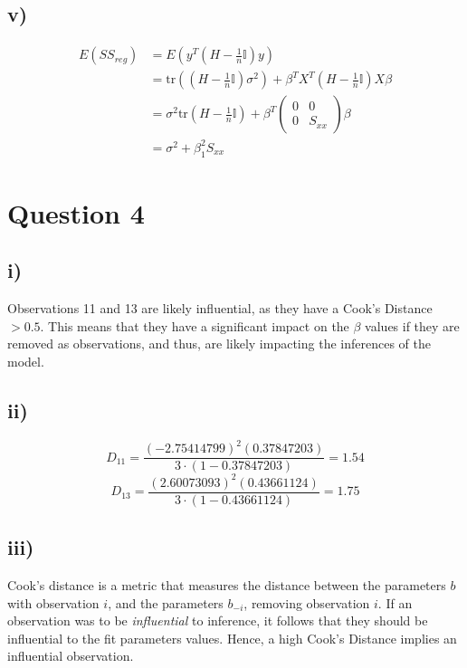 \documentclass{article}
\begin{document}
\subsection*{v)}
\begin{align*}
    E(SS_{reg}) &= E\left( y^T(H - \frac{1}{n}\mathbb{I})y\right) \\ 
    &= \text{tr}((H - \frac{1}{n}\mathbb{I})\sigma^2) + \beta^TX^T(H - \frac{1}{n}\mathbb{I})X\beta \\ 
    &= \sigma^2\text{tr}(H - \frac{1}{n}\mathbb{I}) + \beta^T\begin{pmatrix}
        0 & 0 \\
        0 & S_{xx}
    \end{pmatrix} \beta \\ 
    &= \sigma^2 + \beta_1^2S_{xx}
\end{align*}
\newpage
\section*{Question 4}
\subsection*{i)} 
Observations 11 and 13 are likely influential, as they have a Cook's Distance $> 0.5$. This means that they have a 
significant impact on the $\beta$ values if they are removed as observations, and thus, are likely impacting 
the inferences of the model.

\subsection*{ii)} 
$$ D_{11} = \frac{(-2.75414799)^2(0.37847203)}{3 \cdot (1 - 0.37847203)} = 1.54$$
$$ D_{13} = \frac{(2.60073093)^2(0.43661124)}{3 \cdot (1 - 0.43661124)} = 1.75$$

\subsection*{iii)}
Cook's distance is a metric that measures the distance between the parameters $b$ with observation $i$, and the
parameters $b_{-i}$, removing observation $i$. If an observation was to be \textit{influential} to inference,
it follows that they should be influential to the fit parameters values. Hence, a high Cook's Distance implies an 
influential observation. 
\end{document}
